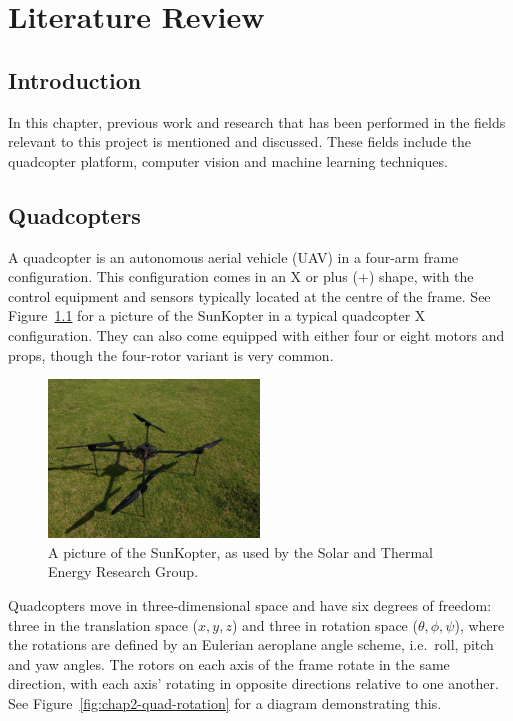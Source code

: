 \chapter{Literature Review}
\label{chap:lit-review}

\section{Introduction}

In this chapter, previous work and research that has been performed in the fields relevant to this project is mentioned and discussed. These fields include the quadcopter platform, computer vision and machine learning techniques. 

\section{Quadcopters}

A quadcopter is an autonomous aerial vehicle (UAV) in a four-arm frame configuration. This configuration comes in an X or plus (+) shape, with the control equipment and sensors typically located at the centre of the frame. See Figure~\ref{fig:chap2-quad} for a picture of the SunKopter in a typical quadcopter X configuration. They can also come equipped with either four or eight motors and props, though the four-rotor variant is very common.

\begin{figure}
  \centering
  \includegraphics[clip, trim = 0 0 30 20, width=0.5\textwidth]{figures/chapter2/quadcopter}
  \caption[A picture of the SunKopter, as used by STERG.]{A picture of the SunKopter, as used by the Solar and Thermal Energy Research Group.}
\label{fig:chap2-quad}
\end{figure}

Quadcopters move in three-dimensional space and have six degrees of freedom: three in the translation space ($x, y, z$) and three in rotation space ($\theta, \phi, \psi$), where the rotations are defined by an Eulerian aeroplane angle scheme, i.e.\ roll, pitch and yaw angles. The rotors on each axis of the frame rotate in the same direction, with each axis' rotating in opposite directions relative to one another. See Figure~\ref{fig:chap2-quad-rotation} for a diagram demonstrating this. 

